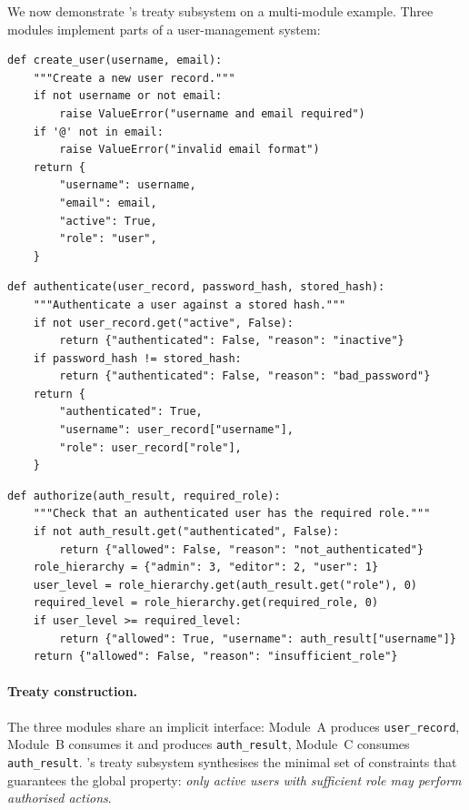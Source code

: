 We now demonstrate \JuGeo{}'s treaty subsystem on a multi-module
example.  Three modules implement parts of a user-management system:

\begin{lstlisting}[style=jugeo-python,caption={Module A: user creation.},label={lst:treaty-a}]
def create_user(username, email):
    """Create a new user record."""
    if not username or not email:
        raise ValueError("username and email required")
    if '@' not in email:
        raise ValueError("invalid email format")
    return {
        "username": username,
        "email": email,
        "active": True,
        "role": "user",
    }
\end{lstlisting}

\begin{lstlisting}[style=jugeo-python,caption={Module B: authentication.},label={lst:treaty-b}]
def authenticate(user_record, password_hash, stored_hash):
    """Authenticate a user against a stored hash."""
    if not user_record.get("active", False):
        return {"authenticated": False, "reason": "inactive"}
    if password_hash != stored_hash:
        return {"authenticated": False, "reason": "bad_password"}
    return {
        "authenticated": True,
        "username": user_record["username"],
        "role": user_record["role"],
    }
\end{lstlisting}

\begin{lstlisting}[style=jugeo-python,caption={Module C: authorisation.},label={lst:treaty-c}]
def authorize(auth_result, required_role):
    """Check that an authenticated user has the required role."""
    if not auth_result.get("authenticated", False):
        return {"allowed": False, "reason": "not_authenticated"}
    role_hierarchy = {"admin": 3, "editor": 2, "user": 1}
    user_level = role_hierarchy.get(auth_result.get("role"), 0)
    required_level = role_hierarchy.get(required_role, 0)
    if user_level >= required_level:
        return {"allowed": True, "username": auth_result["username"]}
    return {"allowed": False, "reason": "insufficient_role"}
\end{lstlisting}

\paragraph{Treaty construction.}
The three modules share an implicit interface: Module~A produces
\texttt{user\_record}, Module~B consumes it and produces
\texttt{auth\_result}, Module~C consumes \texttt{auth\_result}.
\JuGeo{}'s treaty subsystem synthesises the minimal set of constraints
that guarantees the global property:
\emph{only active users with sufficient role may perform authorised
actions}.

